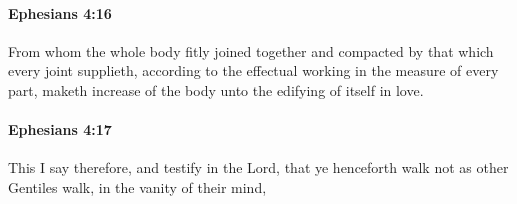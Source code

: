 		\paragraph{Ephesians 4:16} %
			\label{EPHESIANS-4-16}

			From whom the whole body fitly joined together and compacted by that which every joint supplieth, according to the effectual working in the measure of every part, maketh increase of the body unto the edifying of itself in love.

			\begin{framed}
			\scriptsize
				\begin{compactdesc}
					\item[SBLG] 
				\end{compactdesc}
			\end{framed}

		\paragraph{Ephesians 4:17} %
			\label{EPHESIANS-4-17}

			This I say therefore, and testify in the Lord, that ye henceforth walk not as other Gentiles walk, in the vanity of their mind,

